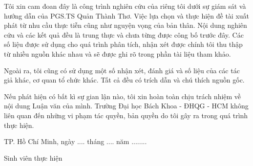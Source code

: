 \begin{declaration}

Tôi xin cam đoan đây là công trình nghiên cứu của riêng tôi dưới
sự giám sát và hướng dẫn của PGS.TS Quản Thành Thơ. Việc lựa chọn
và thực hiện đề tài xuất phát từ nhu cầu thực tiễn cũng như
nguyện vọng của bản thân. Nội dung nghiên cứu và các kết quả
đều là trung thực và chưa từng được công bố trước đây. Các số liệu
được sử dụng cho quá trình phân tích, nhận xét được chính tôi
thu thập từ nhiều nguồn khác nhau và sẽ được ghi rõ
trong phần tài liệu tham khảo.

Ngoài ra, tôi cũng có sử dụng một số nhận xét, đánh giá và số liệu
của các tác giả khác, cơ quan tổ chức khác. Tất cả đều có trích dẫn
và chú thích nguồn gốc.

Nếu phát hiện có bất kì sự gian lận nào, tôi xin hoàn toàn chịu
trách nhiệm về nội dung Luận văn của mình. Trường Đại học Bách Khoa
- ĐHQG - HCM không liên quan đến những vi phạm tác quyền, bản quyền
do tôi gây ra trong quá trình thực hiện.

\begin{flushright}
\begin{minipage}{8cm} %
\centering
TP. Hồ Chí Minh, ngày .... tháng .... năm ........

Sinh viên thực hiện \\[2cm]
\thesisstudent
\end{minipage}
\end{flushright}

\end{declaration}

\tableofcontents
\listoftables
\listoffigures

\mainmatter











